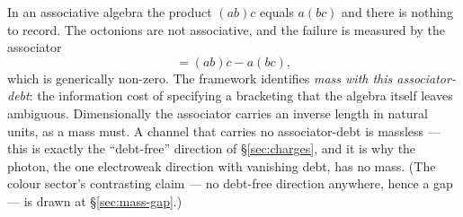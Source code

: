 In an associative algebra the product $(ab)c$ equals $a(bc)$ and there is nothing to record. The
octonions are not associative, and the failure is measured by the associator
\begin{equation}
  [a,b,c] = (ab)c - a(bc),
\end{equation}
which is generically non-zero. The framework identifies \emph{mass with this associator-debt}: the
information cost of specifying a bracketing that the algebra itself leaves ambiguous. Dimensionally
the associator carries an inverse length in natural units, as a mass must. A channel that carries no
associator-debt is massless --- this is exactly the ``debt-free'' direction of \S\ref{sec:charges},
and it is why the photon, the one electroweak direction with vanishing debt, has no mass. (The
colour sector's contrasting claim --- no debt-free direction anywhere, hence a gap --- is drawn at
\S\ref{sec:mass-gap}.)

